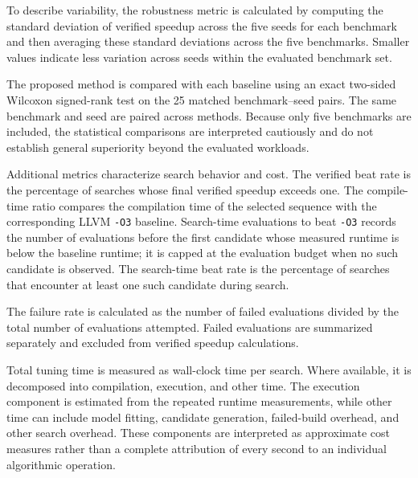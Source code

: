 To describe variability, the robustness metric is calculated by computing the standard deviation of verified speedup across the five seeds for each benchmark and then averaging these standard deviations across the five benchmarks. Smaller values indicate less variation across seeds within the evaluated benchmark set.

The proposed method is compared with each baseline using an exact two-sided Wilcoxon signed-rank test on the 25 matched benchmark--seed pairs. The same benchmark and seed are paired across methods. Because only five benchmarks are included, the statistical comparisons are interpreted cautiously and do not establish general superiority beyond the evaluated workloads.

Additional metrics characterize search behavior and cost. The verified beat rate is the percentage of searches whose final verified speedup exceeds one. The compile-time ratio compares the compilation time of the selected sequence with the corresponding LLVM \texttt{-O3} baseline. Search-time evaluations to beat \texttt{-O3} records the number of evaluations before the first candidate whose measured runtime is below the baseline runtime; it is capped at the evaluation budget when no such candidate is observed. The search-time beat rate is the percentage of searches that encounter at least one such candidate during search.

The failure rate is calculated as the number of failed evaluations divided by the total number of evaluations attempted. Failed evaluations are summarized separately and excluded from verified speedup calculations.

Total tuning time is measured as wall-clock time per search. Where available, it is decomposed into compilation, execution, and other time. The execution component is estimated from the repeated runtime measurements, while other time can include model fitting, candidate generation, failed-build overhead, and other search overhead. These components are interpreted as approximate cost measures rather than a complete attribution of every second to an individual algorithmic operation.
